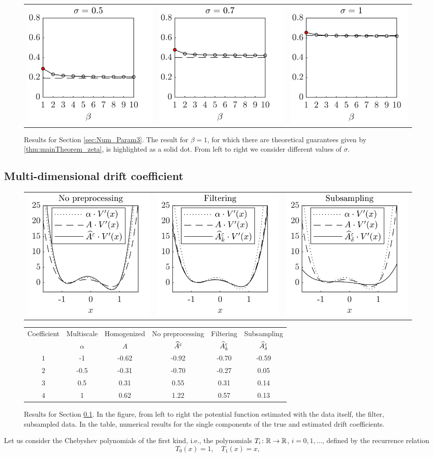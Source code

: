 \documentclass[review,onefignum,onetabnum]{siamonline190516}
\begin{document}
\begin{figure}[t]
	\centering
	\begin{tabular}{ccc}
		\includegraphics[]{Figures/OUBeta_s5} & \includegraphics[]{Figures/OUBeta_s7}  & \includegraphics[]{Figures/OUBeta_s10} \\
	\end{tabular}
	\caption{Results for Section \ref{sec:Num_Param3}. The result for $\beta=1$, for which there are theoretical guarantees given by \cref{thm:mainTheorem_zeta}, is highlighted as a solid dot. From left to right we consider different values of $\sigma$.}
	\label{fig:OUBeta}
\end{figure}

\subsection{Multi-dimensional drift coefficient}\label{sec:Num_Multi}

\begin{figure}[t]
	\centering
	\begin{tabular}{ccc}
		\includegraphics[]{Figures/KLNothing} & \includegraphics[]{Figures/KLFilt}  & \includegraphics[]{Figures/KLSubs}
	\end{tabular}

	\begin{tabular}{cccccc}
		\toprule
		Coefficient & Multiscale & Homogenized & No preprocessing  & Filtering  		  & Subsampling  			 \\ 
		& $\alpha$ & $A$   & $\widehat A^\varepsilon$ & $\widehat A^\varepsilon_k$ & $\widehat A^\varepsilon_\delta$ \\
		\midrule
		$1$ &-1   & -0.62 & -0.92 & -0.70 & -0.59\\
		$2$ &-0.5 & -0.31 & -0.70 & -0.27 & 0.05 \\
		$3$ & 0.5 & 0.31  & 0.55  & 0.31  & 0.14 \\
		$4$ & 1   & 0.62  & 1.22  & 0.57  & 0.13 \\
		\bottomrule
	\end{tabular}
	\caption{Results for Section \ref{sec:Num_Multi}. In the figure, from left to right the potential function estimated with the data itself, the filter, subsampled data. In the table, numerical results for the single components of the true and estimated drift coefficients.}
	\label{fig:KLStyle}
\end{figure}

Let us consider the Chebyshev polynomials of the first kind, i.e., the polynomials $T_i\colon \mathbb{R} \to \mathbb{R}$, $i=0, 1, \ldots$, defined by the recurrence relation
\begin{equation}
T_0(x) = 1, \quad T_1(x) = x,
\end{equation}
\end{document}
